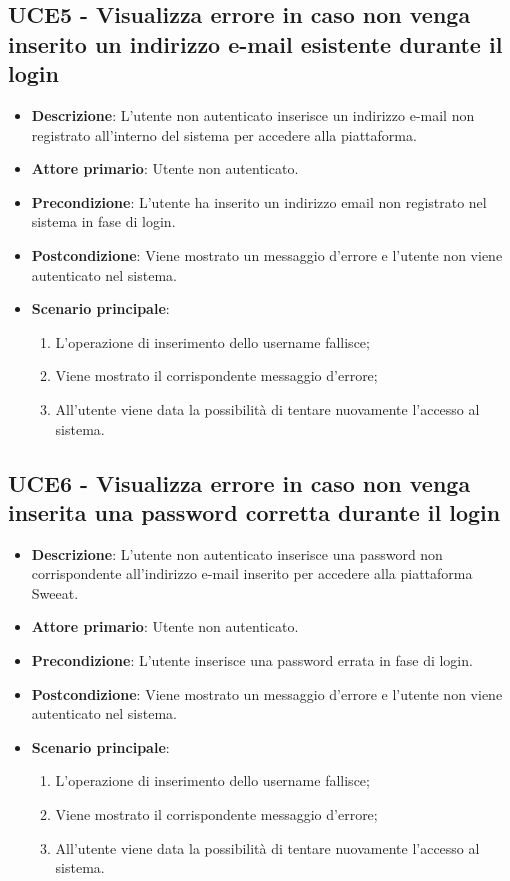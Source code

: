 \subsection{UCE5 - Visualizza errore in caso non venga inserito un indirizzo e-mail esistente durante il login}
\begin{itemize}
\item \textbf{Descrizione}: L'utente non autenticato inserisce un indirizzo e-mail non registrato all'interno del sistema per accedere alla piattaforma.
\item \textbf{Attore primario}: Utente non autenticato.
\item \textbf{Precondizione}: L'utente ha inserito un indirizzo email non registrato nel sistema in fase di login.
\item \textbf{Postcondizione}: Viene mostrato un messaggio d'errore e l'utente non viene autenticato nel sistema.

\item \textbf{Scenario principale}:
\begin{enumerate}
\item L'operazione di inserimento dello username fallisce;
\item Viene mostrato il corrispondente messaggio d'errore;
\item All'utente viene data la possibilità di tentare nuovamente l'accesso al sistema.
\end{enumerate}
\end{itemize}

\subsection{UCE6 - Visualizza errore in caso non venga inserita una password corretta durante il login}
\begin{itemize}
\item \textbf{Descrizione}: L'utente non autenticato inserisce una password non corrispondente all'indirizzo e-mail inserito per accedere alla piattaforma Sweeat.
\item \textbf{Attore primario}: Utente non autenticato.
\item \textbf{Precondizione}: L'utente inserisce una password errata in fase di login.
\item \textbf{Postcondizione}: Viene mostrato un messaggio d'errore e l'utente non viene autenticato nel sistema.

\item \textbf{Scenario principale}:
\begin{enumerate}
\item L'operazione di inserimento dello username fallisce;
\item Viene mostrato il corrispondente messaggio d'errore;
\item All'utente viene data la possibilità di tentare nuovamente l'accesso al sistema.
\end{enumerate}
\end{itemize}

